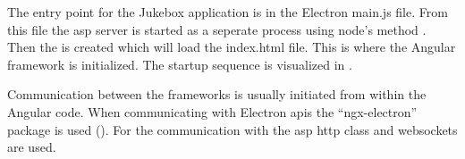 
The entry point for the Jukebox application is in the Electron main.js file. From this file the \gls{asp} server is started as a seperate process using node's  method \cite{nodeSpawn}. Then the  is created which will load the index.html file. This is where the Angular framework is initialized. The startup sequence is visualized in .


Communication between the frameworks is usually initiated from within the Angular code. When communicating with Electron \glspl{api} the \enquote{ngx-electron} package is used (). For the communication with the \gls{asp} \gls{http} class and websockets are used.

